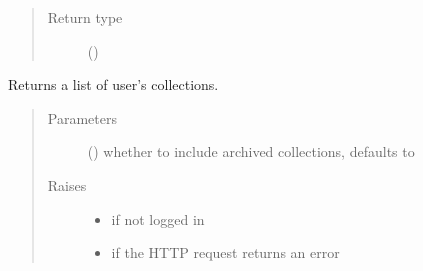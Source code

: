 \documentclass[letterpaper,10pt,english]{sphinxmanual}
\begin{document}
\begin{fulllineitems}
\begin{fulllineitems}
\begin{quote}
\begin{description}
\item[{Return type}] \leavevmode
\sphinxAtStartPar
{}()

\end{description}\end{quote}

\end{fulllineitems}


\begin{fulllineitems}
\label{\detokenize{autoapi/pine/client/index:pine.client.PineClient.list_collections}}
\sphinxAtStartPar
Returns a list of user’s collections.
\begin{quote}\begin{description}
\item[{Parameters}] \leavevmode
\sphinxAtStartPar
{} () \textendash{} whether to include archived collections, defaults to 

\item[{Raises}] \leavevmode\begin{itemize}
\item {} 
\sphinxAtStartPar
{\hyperref[\detokenize{autoapi/pine/client/exceptions/index:pine.client.exceptions.PineClientAuthException}]{}} \textendash{} if not logged in

\item {} 
\sphinxAtStartPar
{\hyperref[\detokenize{autoapi/pine/client/exceptions/index:pine.client.exceptions.PineClientHttpException}]{}} \textendash{} if the HTTP request returns an error


\end{itemize}
\end{description}
\end{quote}
\end{fulllineitems}
\end{fulllineitems}
\end{document}
